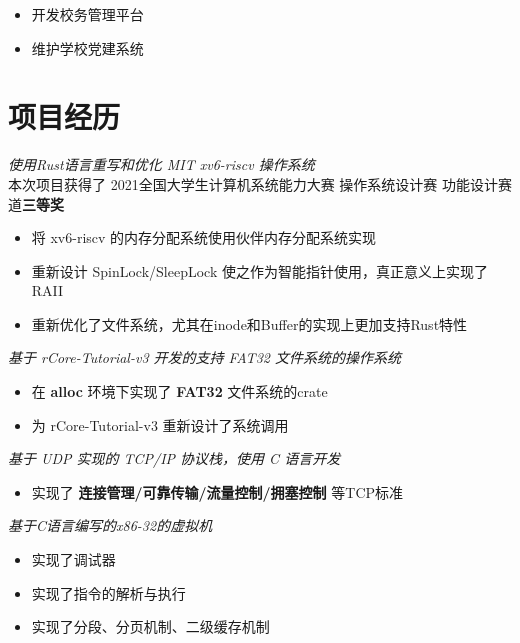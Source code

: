 \documentclass{cv}
\begin{document}
\begin{itemize}
  \item 开发校务管理平台
  \item 维护学校党建系统
\end{itemize}


\section{项目经历}

{\it 使用Rust语言重写和优化 MIT xv6-riscv 操作系统}
\vspace{0.4ex}
\\
本次项目获得了 2021全国大学生计算机系统能力大赛 操作系统设计赛 功能设计赛道\textbf{三等奖}
\begin{itemize}
  \item 将 xv6-riscv 的内存分配系统使用伙伴内存分配系统实现
  \item 重新设计 SpinLock/SleepLock 使之作为智能指针使用，真正意义上实现了 RAII
  \item 重新优化了文件系统，尤其在inode和Buffer的实现上更加支持Rust特性
\end{itemize}


{\it 基于 rCore-Tutorial-v3 开发的支持 FAT32 文件系统的操作系统}
\vspace{0.4ex}
\begin{itemize}
  \item 在 \textbf{alloc} 环境下实现了 \textbf{FAT32} 文件系统的crate
  \item 为 rCore-Tutorial-v3 重新设计了系统调用
\end{itemize}


{\it 基于 UDP 实现的 TCP/IP 协议栈，使用 C 语言开发}
\vspace{0.4ex}
\begin{itemize}
  \item 实现了 \textbf{连接管理/可靠传输/流量控制/拥塞控制} 等TCP标准
\end{itemize}


{\it 基于C语言编写的x86-32的虚拟机}
\vspace{0.4ex}
\begin{itemize}
  \item 实现了调试器
  \item 实现了指令的解析与执行
  \item 实现了分段、分页机制、二级缓存机制
\end{itemize}
\end{document}
